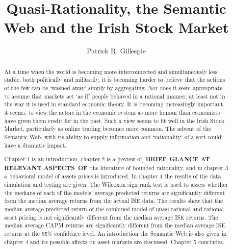 \documentclass{ucthesis}
\begin{document}
\title{Quasi-Rationality, the Semantic Web and the Irish Stock Market}
\author{Patrick R. Gillespie}
\maketitle
\approvalpage{}
\copyrightpage{}

\begin{abstract}
At a time when the world is becoming more interconnected and simultaneously
less stable, both politically and militarily, it is becoming harder to
believe that the actions of the few can be `washed away' simply by
aggregating. Nor does it seem appropriate to assume that markets act `as if'
people behaved in a rational manner, at least not in the way it is used in
standard economic theory. It is becoming increasingly important, it seems,
to view the actors in the economic system as more human than economists have
given them credit for in the past. Such a view seems to fit well in the
Irish Stock Market, particularly as online trading becomes more common. The
advent of the Semantic Web, with its ability to supply information and
`rationality' of a sort could have a dramatic impact.

Chapter 1 is an introduction, chapter 2 is a [review of] \textbf{BRIEF}\ 
\textbf{GLANCE AT} \textbf{RELEVANT ASPECTS\ OF}\ the literature of bounded
rationality, and in chapter 3 a behavioral model of assets prices is
introduced. In chapter 4 the results of the data simulation and testing are
given. The Wilcoxon sign rank test is used to assess whether the medians of
each of the models' average predicted returns are significantly different
from the median average returns from the actual ISE data. The results show
that the median average predicted return of the combined model of
quasi-rational and rational asset pricing is not significantly different
from the median average ISE returns. The median average CAPM returns are
significantly different from the median average ISE returns at the 95\%
confidence level. An introduction the Semantic Web is also given in chapter
4 and its possible affects on asset markets are discussed. Chapter 5
concludes.
\end{abstract}
\end{document}
